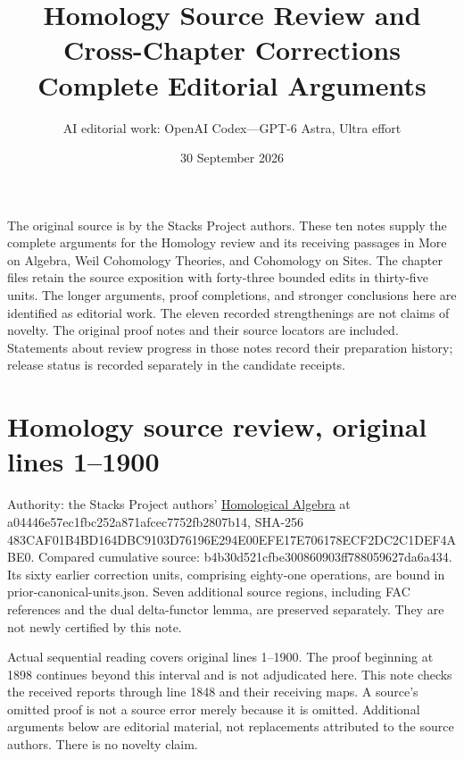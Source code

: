 \documentclass[11pt]{article}
\title{Homology Source Review and Cross-Chapter Corrections\\Complete Editorial Arguments}
\author{AI editorial work: OpenAI Codex---GPT-6 Astra, Ultra effort}
\date{30 September 2026}
\begin{document}
\maketitle
\noindent
The original source is by the Stacks Project authors. These ten notes
supply the complete arguments for the Homology review and its receiving
passages in More on Algebra, Weil Cohomology Theories, and Cohomology on
Sites. The chapter files retain the source exposition with forty-three
bounded edits in thirty-five units. The longer arguments, proof
completions, and stronger conclusions here are identified as editorial
work. The eleven recorded strengthenings are not claims of novelty.
The original proof notes and their source locators are included. Statements
about review progress in those notes record their preparation history;
release status is recorded separately in the candidate receipts.
\setcounter{secnumdepth}{1}
\tableofcontents\clearpage
\section{Homology source review, original lines 1--1900}\label{note-01-homology-source-review-original-lines-11900}

Authority: the Stacks Project authors' \href{https://github.com/stacks/stacks-project/blob/a04446e5\allowbreak{}7ec1fbc2\allowbreak{}52a871af\allowbreak{}cec7752f\allowbreak{}b2807b14/homology.tex}{Homological Algebra} at a04446e5\allowbreak{}7ec1fbc2\allowbreak{}52a871af\allowbreak{}cec7752f\allowbreak{}b2807b14, SHA-256 483CAF01\allowbreak{}B4BD164D\allowbreak{}BC9103D7\allowbreak{}6196E294\allowbreak{}E00EFE17\allowbreak{}E706178E\allowbreak{}CF2DC2C1\allowbreak{}DEF4ABE0. Compared cumulative source: b4b30d52\allowbreak{}1cfbe300\allowbreak{}860903ff\allowbreak{}78805962\allowbreak{}7da6a434. Its sixty earlier correction units, comprising eighty-one operations, are bound in prior-canonical-units.json. Seven additional source regions, including FAC references and the dual delta-functor lemma, are preserved separately. They are not newly certified by this note.

Actual sequential reading covers original lines 1--1900. The proof beginning at 1898 continues beyond this interval and is not adjudicated here. This note checks the received reports through line 1848 and their receiving maps. A source's omitted proof is not a source error merely because it is omitted. Additional arguments below are editorial material, not replacements attributed to the source authors. There is no novelty claim.
\end{document}
